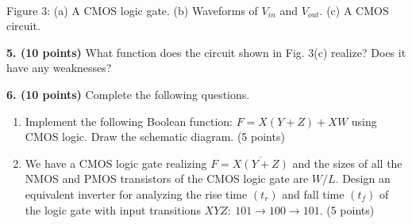 \documentclass[10pt]{article}
\begin{document}
\begin{center}
\\Figure 3: (a) A CMOS logic gate. (b) Waveforms of $V_{in}$ and $V_{out}$. (c) A CMOS circuit.\end{center}\textbf{5. (10 points)} What function does the circuit shown in Fig. 3(c) realize? Does it have any weaknesses?\par\vspace{5mm}\textbf{6. (10 points)} Complete the following questions.
\begin{enumerate}[label=(\alph*),leftmargin=7mm]
\item Implement the following Boolean function: $F=X(Y+Z)+XW$ using CMOS logic. Draw the schematic diagram. (5 points)
\item We have a CMOS logic gate realizing $F=\overline{X(Y+Z)}$ and the sizes of all the NMOS and PMOS transistors of the CMOS logic gate are $W/L$. Design an equivalent inverter for analyzing the rise time $(t_r)$ and fall time $(t_f)$ of the logic gate with input transitions $XYZ:\ 101\to100\to101$. (5 points)
\end{enumerate}
\end{document}
